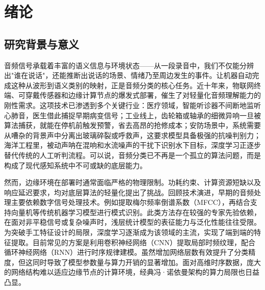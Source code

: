 
\section{绪论} \label{section:one}

\subsection{研究背景与意义}
音频信号承载着丰富的语义信息与环境状态——从一段录音中，我们不仅能分辨出"谁在说话"，还能推断出说话的场景、情绪乃至周边发生的事件。让机器自动完成这种从波形到语义类别的映射，正是音频分类的核心任务。近十年来，物联网终端、可穿戴传感器和边缘计算节点的爆发式部署，催生了对轻量化音频理解能力的刚性需求。这项技术已渗透到多个关键行业：医疗领域，智能听诊器不间断地监听心肺音，医生借此捕捉早期病变信号；工业线上，齿轮箱或轴承的细微异响一旦被算法捕获，就能在停机前触发预警，省去高昂的抢修成本；安防场景中，系统需要从嘈杂的背景声中分离出玻璃碎裂或呼救声，这要求模型具备极强的抗噪判别力；海洋工程里，被动声呐在混响和水流噪声的干扰下识别水下目标，深度学习正逐步替代传统的人工听判流程。可以说，音频分类已不再是一个孤立的算法问题，而是构成了现代感知系统中不可或缺的底层能力。

然而，边缘环境在部署时通常面临严格的物理限制。功耗约束、计算资源短缺以及响应延迟要求，均对底层算法的轻量化提出了挑战。回顾技术演进，早期的音频处理主要依赖数字信号处理技术。例如提取梅尔频率倒谱系数（MFCC），再结合支持向量机等传统机器学习模型进行模式识别。此类方法存在较强的专家先验依赖，在面对非平稳信号或复杂噪声时，浅层统计模型的表征能力与泛化性能往往受限。为突破手工特征设计的局限，深度学习逐渐成为该领域的主流，实现了端到端的特征提取。目前常见的方案是利用卷积神经网络（CNN）提取局部时频纹理，配合循环神经网络（RNN）进行时序规律建模。虽然增加网络层数有效提升了分类精度，但这同时导致了模型参数量与算力开销的显著增加。面对高维时序数据，庞大的网络结构难以适应边缘节点的计算环境，经典冯·诺依曼架构的算力局限也日益凸显。

